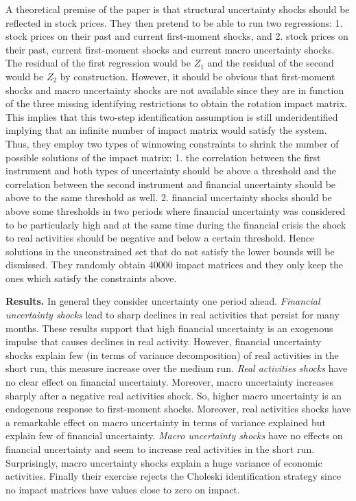 \documentclass{article}
\begin{document}
{A theoretical premise of the paper is that structural uncertainty shocks should be reflected in stock prices. They then pretend to be able to run two regressions: 1. stock prices on their past and current first-moment shocks, and 2. stock prices on their past, current first-moment shocks and current macro uncertainty shocks. The residual of the first regression would be $Z_1$ and the residual of the second would be $Z_2$ by construction. However, it should be obvious that first-moment shocks and macro uncertainty shocks are not available since they are in function of the three missing identifying restrictions to obtain the rotation impact matrix. This implies that this two-step identification assumption is still underidentified implying that an infinite number of impact matrix would satisfy the system. Thus, they employ two types of winnowing constraints to shrink the number of possible solutions of the impact matrix: 1. the correlation between the first instrument and both types of uncertainty should be above a threshold and the correlation between the second instrument and financial uncertainty should be above to the same threshold as well. 2. financial uncertainty shocks should be above some thresholds in two periods where financial uncertainty was considered to be particularly high and at the same time during the financial crisis the shock to real activities should be negative and below a certain threshold. Hence solutions in the unconstrained set that do not satisfy the lower bounds will be dismissed. They randomly obtain 40000 impact matrices and they only keep the ones which satisfy the constraints above.

\textbf{Results.} In general they consider uncertainty one period ahead. \textit{Financial uncertainty shocks} lead to sharp declines in real activities that persist for many months. These results support that high financial uncertainty is an exogenous impulse that causes declines in real activity. However, financial uncertainty shocks explain few (in terms of variance decomposition) of real activities in the short run, this measure increase over the medium run. \textit{Real activities shocks} have no clear effect on financial uncertainty. Moreover, macro uncertainty increases sharply after a negative real activities shock. So, higher macro uncertainty is an endogenous response to first-moment shocks. Moreover, real activities shocks have a remarkable effect on macro uncertainty in terms of variance explained but explain few of financial uncertainty. \textit{Macro uncertainty shocks} have no effects on financial uncertainty and seem to increase real activities in the short run. Surprisingly, macro uncertainty shocks explain a huge variance of economic activities. Finally their exercise rejects the Choleski identification strategy since no impact matrices have values close to zero on impact.

}
\end{document}
